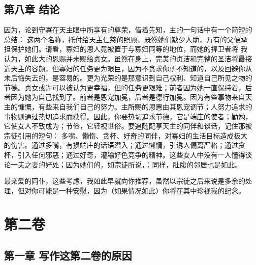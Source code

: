 
\subsection{第八章 结论}

因为，论到守寡在天主眼中所享有的尊荣，借着先知，主的一句话中有一个简短的总结： 这两个名称，托付给天主仁慈的照顾，既然她们缺少人助，万有的父便承担保护她们。请看，寡妇的恩人竟被置于与寡妇同等的地位，而她的捍卫者将 我认为，如此大的恩赐并未赐给贞女。虽然在身上，完美的贞洁和完整的圣洁将最接近天主的容颜，但寡妇的任务更为艰巨，因为不贪求你所不知道的，以及回避你从未后悔失去的，是容易的。更为光荣的是那意识到自己权利、知道自己所见之物的节德。贞女或许可以被认为更幸福，但的任务更艰难；前者因为她一直保持着，后者因为她为自己找到了。前者是恩宠加冕，后者是德行加冕。因为有些事物来自天主的慷慨，有些来自我们自己的努力。主所赐的恩惠由其恩宠调节；人努力追求的事物则通过热切追求而获得。因此，你要热切追求节德，它是端庄的使者；勤勉，它使女人不致成为；节俭，它轻视世俗。要追随配享天主的同伴和谈话，记住那被宗徒引用的短句： 多嘴、懒惰、贪杯、好奇的同伴，对寡妇的生活目标造成极大的伤害。通过多嘴，有损端庄的话语潜入；通过懒惰，引诱人偏离严格；通过贪杯，引入任何邪恶；通过好奇，灌输好色竞争的精神。这些女人中没有一人懂得谈论一夫之妻的好处；因为她们的，如宗徒所说，；同样，肚腹的邻居也是如此。\par

最亲爱的同仆，这些考虑，我如此早就向你推荐，虽然以宗徒之后来说是多余的处理，但对你可能是一种安慰，因为（如果情况如此）你将在其中珍视我的纪念。\par


\section{第二卷}


\subsection{第一章 写作这第二卷的原因}

